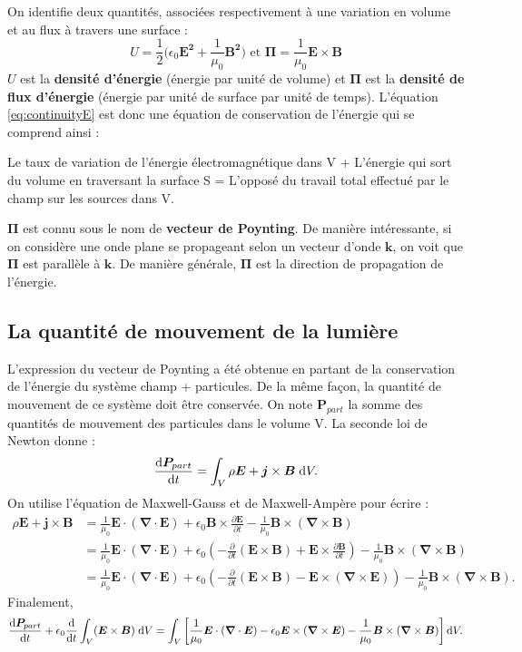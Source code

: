On identifie deux quantités, associées respectivement à une variation en volume et au flux à travers une surface : 
\begin{equation}
U=\frac{1}{2}\biggl(\epsilon_0\bm{E^2}+\frac{1}{\mu_0}\bm{B^2}\biggr) \mbox{   et   } \bm{\Pi} = \frac{1}{\mu_0}\bm{E}\times\bm{B}
\label{Def.Poynting}
\end{equation}
$U$ est la \textbf{densité d'énergie} (énergie par unité de volume) et $\bm{\Pi}$ est la \textbf{densité de flux d'énergie} (énergie par unité de surface par unité de temps). L'équation \ref{eq:continuityE} est donc une équation de conservation de l'énergie qui se comprend ainsi :

Le taux de variation de l'énergie électromagnétique dans V + L'énergie qui sort du volume en traversant la surface S = L'opposé du travail total effectué par le champ sur les sources dans V.

$\bm{\Pi}$ est connu sous le nom de \textbf{vecteur de Poynting}. De manière intéressante, si on considère une onde plane se propageant selon un vecteur d'onde $\bm{k}$, on voit que $\bm{\Pi}$ est parallèle à $\bm{k}$. De manière générale, $\bm{\Pi}$ est la direction de propagation de l'énergie.

\subsection{La quantité de mouvement de la lumière}
L'expression du vecteur de Poynting a été obtenue en partant de la conservation de l'énergie du système champ + particules. De la même façon, la quantité de mouvement de ce système doit être conservée. On note $\bm{P}_{part}$ la somme des quantités de mouvement des particules dans le volume V. La seconde loi de Newton donne :
\begin{equation}
\frac{\mathrm{d}\bm{P}_{part}}{\mathrm{d} t}=\int_V \rho \bm{E} + \bm{j}\times\bm{B}\;\mathrm{d} V.
\end{equation} 
On utilise l'équation de Maxwell-Gauss et de Maxwell-Ampère pour écrire :
\begin{align}
\rho \bm{E} + \bm{j}\times\bm{B} &= \frac{1}{\mu_0} \bm{E}\cdot(\bm{\nabla}\cdot\bm{E})+\epsilon_0 \bm{B}\times\frac{\partial \bm{E}}{\partial t}-\frac{1}{\mu_0}\bm{B}\times(\bm{\nabla}\times\bm{B})\\
&= \frac{1}{\mu_0} \bm{E}\cdot(\bm{\nabla}\cdot\bm{E})+\epsilon_0 
\left(-\frac{\partial}{\partial t}(\bm{E}\times\bm{B})+\bm{E}\times\frac{\partial \bm{B}}{\partial t}\right)
-\frac{1}{\mu_0}\bm{B}\times(\bm{\nabla}\times\bm{B})\\
&= \frac{1}{\mu_0} \bm{E}\cdot(\bm{\nabla}\cdot\bm{E})+\epsilon_0\left(-\frac{\partial}{\partial t}(\bm{E}\times\bm{B})-\bm{E}\times(\bm{\nabla}\times\bm{E})\right)
-\frac{1}{\mu_0}\bm{B}\times(\bm{\nabla}\times\bm{B}).
\end{align} 
Finalement,
\begin{equation}
\frac{\mathrm{d}\bm{P}_{part}}{\mathrm{d} t}+\epsilon_0\frac{\mathrm{d}}{\mathrm{d} t}\int_V (\bm{E}\times\bm{B})\; \mathrm{d} V=\int_V \left[\frac{1}{\mu_0} \bm{E}\cdot(\bm{\nabla}\cdot\bm{E})-\epsilon_0\bm{E}\times(\bm{\nabla}\times\bm{E})
-\frac{1}{\mu_0}\bm{B}\times(\bm{\nabla}\times\bm{B})\right]\mathrm{d} V.
\end{equation} 

